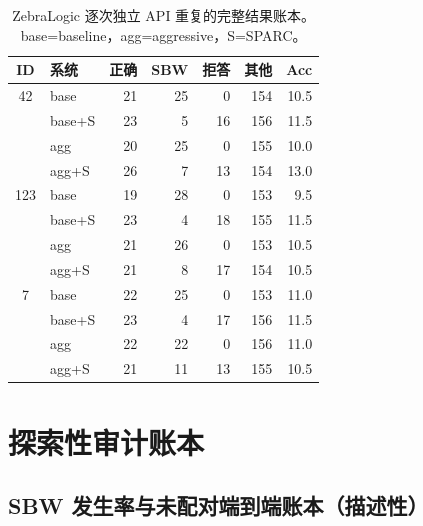 \documentclass[letterpaper]{article}
\newcommand{\sbw}{SBW}
\newif\ifincludeexploratory
\begin{document}
\begin{table}[t]
  \centering
  \caption{ZebraLogic 逐次独立 API 重复的完整结果账本。base=baseline，agg=aggressive，S=SPARC。}
  \label{tab:per-seed}
  \small
  \renewcommand{\arraystretch}{0.84}
  \setlength{\tabcolsep}{3pt}
  \begin{tabular}{clrrrrr}
    \toprule
    ID & 系统 & 正确 & \sbw{} & 拒答 & 其他 & Acc \\
    \midrule
    42  & base  & 21 & 25 & 0  & 154 & 10.5 \\
        & base+S & 23 & 5  & 16 & 156 & 11.5 \\
        & agg   & 20 & 25 & 0  & 155 & 10.0 \\
        & agg+S  & 26 & 7  & 13 & 154 & 13.0 \\
    \midrule
    123 & base  & 19 & 28 & 0  & 153 & 9.5 \\
        & base+S & 23 & 4  & 18 & 155 & 11.5 \\
        & agg   & 21 & 26 & 0  & 153 & 10.5 \\
        & agg+S  & 21 & 8  & 17 & 154 & 10.5 \\
    \midrule
    7   & base  & 22 & 25 & 0  & 153 & 11.0 \\
        & base+S & 23 & 4  & 17 & 156 & 11.5 \\
        & agg   & 22 & 22 & 0  & 156 & 11.0 \\
        & agg+S  & 21 & 11 & 13 & 155 & 10.5 \\
    \bottomrule
  \end{tabular}
\end{table}

\enlargethispage{3\baselineskip}

\ifincludeexploratory
\section{探索性审计账本}
\label{app:exploratory}

\subsection{\sbw{} 发生率与未配对端到端账本（描述性）}
\label{sec:main}
\end{document}
